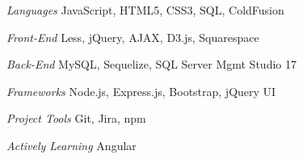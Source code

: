 \begin{minipage}[t]{0.5\textwidth}
\begin{cvskills}

  \cvskill
    {\textit{Languages}} %
    {JavaScript, HTML5, CSS3, SQL, ColdFusion} %


 \cvskill
    {\textit{Front-End}} %
    {Less, jQuery, AJAX, D3.js, Squarespace} %


  \cvskill
    {\textit{Back-End}} %
    {MySQL, Sequelize, SQL Server Mgmt Studio 17} %

 
\end{cvskills}
\end{minipage}%
\begin{minipage}[t]{0.5\textwidth}
\begin{cvskills}

  \cvskill
    {\textit{Frameworks}} %
    {Node.js, Express.js, Bootstrap, jQuery UI} %


  \cvskill
    {\textit{Project Tools}} %
    {Git, Jira, npm} %


  \cvskill
    {\textit{Actively Learning}} %
    {Angular} %

\end{cvskills}
\end{minipage}

%